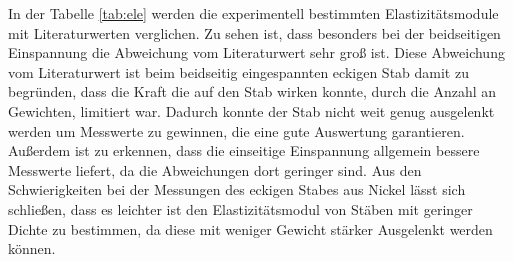 In der Tabelle \ref{tab:ele} werden die experimentell bestimmten Elastizitätsmodule mit Literaturwerten verglichen.
Zu sehen ist, dass besonders bei der beidseitigen Einspannung die Abweichung vom Literaturwert sehr groß ist.
Diese Abweichung vom Literaturwert ist beim beidseitig eingespannten eckigen Stab damit zu begründen, dass die Kraft die auf den Stab wirken konnte, durch die Anzahl an Gewichten, limitiert war.
Dadurch konnte der Stab nicht weit genug ausgelenkt werden um Messwerte zu gewinnen, die eine gute Auswertung garantieren.
Außerdem ist zu erkennen, dass die einseitige Einspannung allgemein bessere Messwerte liefert, da die Abweichungen dort geringer sind.
Aus den Schwierigkeiten bei der Messungen des eckigen Stabes aus Nickel lässt sich schließen, dass es leichter ist den Elastizitätsmodul von Stäben mit geringer Dichte zu bestimmen, da diese mit weniger Gewicht stärker Ausgelenkt werden können.

